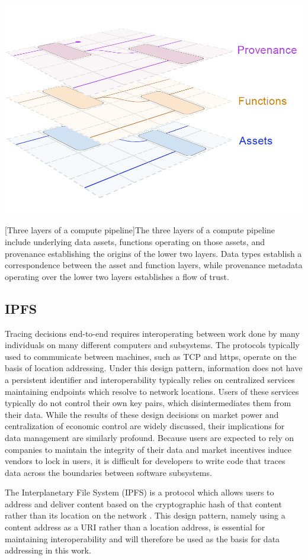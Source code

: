 \documentclass[9pt, oneside]{article}   	%
\begin{document}
\begin{center}
\includegraphics[width=0.5\columnwidth]{Fig1_assets_20230715}
\begin{flushright}
[Three layers of a compute pipeline]{The three layers of a compute pipeline include underlying data assets, functions operating on those assets, and provenance establishing the origins of the lower two layers. Data types establish a correspondence between the asset and function layers, while provenance metadata operating over the lower two layers establishes a flow of trust.}
\label{layeredDataFig1}
\end{flushright}
\end{center}

\subsection{IPFS}\label{IPFS}
Tracing decisions end-to-end requires interoperating between work done by many individuals on many different computers and subsystems. The protocols typically used to communicate between machines, such as TCP and https, operate on the basis of location addressing. Under this design pattern, information does not have a persistent identifier and interoperability typically relies on centralized services maintaining endpoints which resolve to network locations. Users of these services typically do not control their own key pairs, which disintermediates them from their data. While the results of these design decisions on market power and centralization of economic control are widely discussed, their implications for data management are similarly profound. Because users are expected to rely on companies to maintain the integrity of their data and market incentives induce vendors to lock in users, it is difficult for developers to write code that traces data across the boundaries between software subsystems.

The Interplanetary File System (IPFS) is a protocol which allows users to address and deliver content based on the cryptographic hash of that content rather than its location on the network \cite{ipfs-paper}. This design pattern, namely using a content address as a URI rather than a location address, is essential for maintaining interoperability and will therefore be used as the basis for data addressing in this work.
\end{document}
